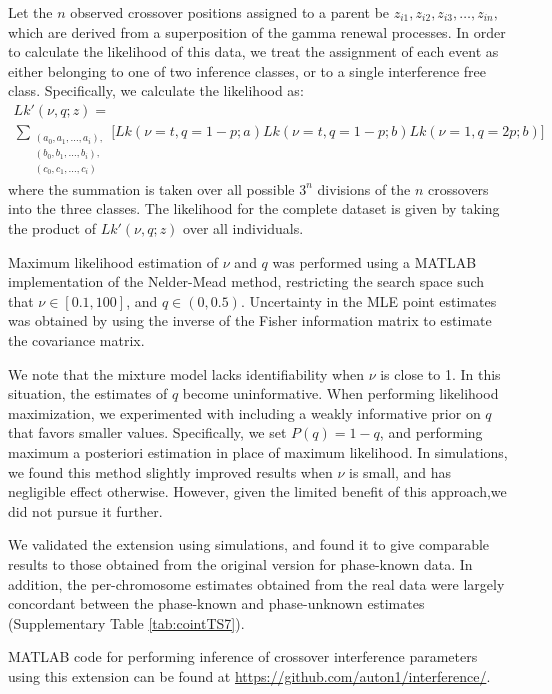 Let the $n$ observed crossover positions assigned to a parent be $z_{i1},z_{i2},z_{i3},\dots,z_{in},$ 
which are derived from a superposition of the gamma renewal processes. In order to calculate the 
likelihood of this data, we treat the assignment of each event as either belonging to one of 
two inference classes, or to a single interference free class. Specifically, we calculate the likelihood as:  
\begin{multline}
    Lk'(\nu,q;z) = \\
    \sum_{\substack{ (a_0,a_1,\dots,a_i), \\
                     (b_0,b_1,\dots,b_i), \\
                     (c_0,c_1,\dots,c_i)
             }}
    \Big[ Lk(\nu=t,q=1-p;a) Lk(\nu=t,q=1-p;b) Lk(\nu=1,q=2p;b) \Big]
\end{multline}
where the summation is taken over all possible $3^n$ divisions of the $n$ crossovers into  
the three classes. The likelihood for the complete dataset is given by taking the  
product of $Lk'(\nu,q;z)$ over all individuals. 

Maximum likelihood estimation of $\nu$ and $q$ was performed using a MATLAB  
implementation of the Nelder-Mead method\cite{DErrico}, restricting the search space such  
that $\nu \in [0.1,100]$, and $q \in (0,0.5)$. Uncertainty in the MLE point estimates was  
obtained by using the inverse of the Fisher information matrix to estimate the  
covariance matrix.  
 
We note that the mixture model lacks identifiability when $\nu$ is close to 1. 
In this situation, the estimates of $q$  become uninformative. When performing likelihood 
maximization, we experimented with including a weakly informative prior on $q$  that favors 
smaller values. Specifically, we set $P(q)= 1 - q$, and performing maximum a posteriori 
estimation in place of maximum likelihood. In simulations, we found this method slightly 
improved results when $\nu$ is small, and has negligible effect otherwise. However, given 
the limited benefit of this approach,we did not pursue it further.  

We validated the extension using simulations, and found it to give comparable results to 
those obtained from the original version for phase-known data. In addition, the per-chromosome 
estimates obtained from the real data were largely concordant between the phase-known and 
phase-unknown estimates (Supplementary Table \ref{tab:cointTS7}).  

MATLAB code for performing inference of crossover interference parameters using this 
extension can be found at \url{https://github.com/auton1/interference/}.

